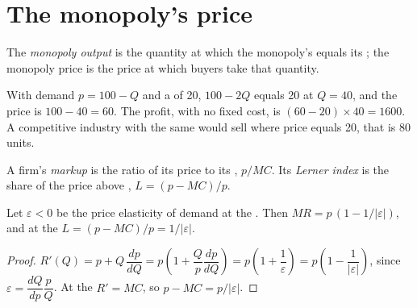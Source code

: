 \section{The monopoly's price}\label{sec:g11:monopoly:price}

\begin{definition}\label{def:g11:monopoly:monopoly-output}
The \emph{monopoly output} is the quantity at which the monopoly's  equals its ; the monopoly price is the price
at which buyers take that quantity.
\end{definition}

\begin{example}\label{ex:g11:monopoly:line}
With demand $p = 100 - Q$ and a  of 20,  $100 - 2Q$ equals 20 at $Q = 40$, and the price is $100 - 40 = 60$. The profit, with no fixed
cost, is $(60 - 20) \times 40 = 1600$. A competitive industry with the same  would sell where price equals 20, that is 80 units.
\end{example}

\begin{definition}\label{def:g11:monopoly:markup}
A firm's \emph{markup} is the ratio of its price to its , $p/\mathit{MC}$. Its \emph{Lerner index}\label{def:g11:monopoly:lerner} is the share of the price above , $L = (p - \mathit{MC})/p$.
\end{definition}

\begin{proposition}\label{prop:g11:monopoly:lerner}
Let $\varepsilon < 0$ be the price elasticity of demand at the . Then $\mathit{MR} = p\,(1 - 1/|\varepsilon|)$, and at the  $L = (p - \mathit{MC})/p =
1/|\varepsilon|$.
\end{proposition}
\begin{proof}
$R'(Q) = p + Q\,\dfrac{dp}{dQ} = p\left(1 + \dfrac{Q}{p}\dfrac{dp}{dQ}\right) = p\left(1 + \dfrac{1}{\varepsilon}\right) = p\left(1 - \dfrac{1}{|\varepsilon|}\right)$, since $\varepsilon = \dfrac{dQ}{dp}\dfrac{p}{Q}$.
At the  $R' = \mathit{MC}$, so $p - \mathit{MC} = p/|\varepsilon|$.
\end{proof}

